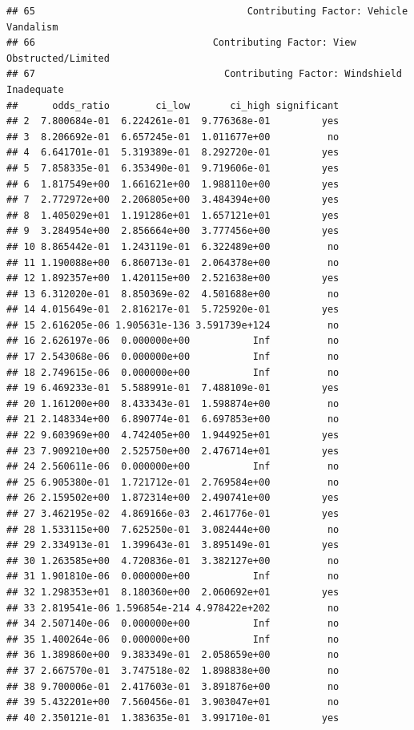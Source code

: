 \documentclass[10pt]{article}\usepackage[]{graphicx}\usepackage[]{xcolor}
\makeatletter
\newenvironment{kframe}{%
 \def\at@end@of@kframe{}%
 \ifinner\ifhmode%
  \def\at@end@of@kframe{\end{minipage}}%
  \begin{minipage}{\columnwidth}%
 \fi\fi%
 \def\FrameCommand##1{\hskip\@totalleftmargin \hskip-\fboxsep
 \colorbox{shadecolor}{##1}\hskip-\fboxsep
     \hskip-\linewidth \hskip-\@totalleftmargin \hskip\columnwidth}%
 \MakeFramed {\advance\hsize-\width
   \@totalleftmargin\z@ \linewidth\hsize
   \@setminipage}}%
 {\par\unskip\endMakeFramed%
 \at@end@of@kframe}
\newenvironment{knitrout}{}{} %
\makeatother
\begin{document}
\begin{knitrout}
\begin{kframe}
\begin{verbatim}
## 65                                     Contributing Factor: Vehicle Vandalism
## 66                               Contributing Factor: View Obstructed/Limited
## 67                                 Contributing Factor: Windshield Inadequate
##      odds_ratio        ci_low       ci_high significant
## 2  7.800684e-01  6.224261e-01  9.776368e-01         yes
## 3  8.206692e-01  6.657245e-01  1.011677e+00          no
## 4  6.641701e-01  5.319389e-01  8.292720e-01         yes
## 5  7.858335e-01  6.353490e-01  9.719606e-01         yes
## 6  1.817549e+00  1.661621e+00  1.988110e+00         yes
## 7  2.772972e+00  2.206805e+00  3.484394e+00         yes
## 8  1.405029e+01  1.191286e+01  1.657121e+01         yes
## 9  3.284954e+00  2.856664e+00  3.777456e+00         yes
## 10 8.865442e-01  1.243119e-01  6.322489e+00          no
## 11 1.190088e+00  6.860713e-01  2.064378e+00          no
## 12 1.892357e+00  1.420115e+00  2.521638e+00         yes
## 13 6.312020e-01  8.850369e-02  4.501688e+00          no
## 14 4.015649e-01  2.816217e-01  5.725920e-01         yes
## 15 2.616205e-06 1.905631e-136 3.591739e+124          no
## 16 2.626197e-06  0.000000e+00           Inf          no
## 17 2.543068e-06  0.000000e+00           Inf          no
## 18 2.749615e-06  0.000000e+00           Inf          no
## 19 6.469233e-01  5.588991e-01  7.488109e-01         yes
## 20 1.161200e+00  8.433343e-01  1.598874e+00          no
## 21 2.148334e+00  6.890774e-01  6.697853e+00          no
## 22 9.603969e+00  4.742405e+00  1.944925e+01         yes
## 23 7.909210e+00  2.525750e+00  2.476714e+01         yes
## 24 2.560611e-06  0.000000e+00           Inf          no
## 25 6.905380e-01  1.721712e-01  2.769584e+00          no
## 26 2.159502e+00  1.872314e+00  2.490741e+00         yes
## 27 3.462195e-02  4.869166e-03  2.461776e-01         yes
## 28 1.533115e+00  7.625250e-01  3.082444e+00          no
## 29 2.334913e-01  1.399643e-01  3.895149e-01         yes
## 30 1.263585e+00  4.720836e-01  3.382127e+00          no
## 31 1.901810e-06  0.000000e+00           Inf          no
## 32 1.298353e+01  8.180360e+00  2.060692e+01         yes
## 33 2.819541e-06 1.596854e-214 4.978422e+202          no
## 34 2.507140e-06  0.000000e+00           Inf          no
## 35 1.400264e-06  0.000000e+00           Inf          no
## 36 1.389860e+00  9.383349e-01  2.058659e+00          no
## 37 2.667570e-01  3.747518e-02  1.898838e+00          no
## 38 9.700006e-01  2.417603e-01  3.891876e+00          no
## 39 5.432201e+00  7.560456e-01  3.903047e+01          no
## 40 2.350121e-01  1.383635e-01  3.991710e-01         yes

\end{verbatim}
\end{kframe}
\end{knitrout}
\end{document}
